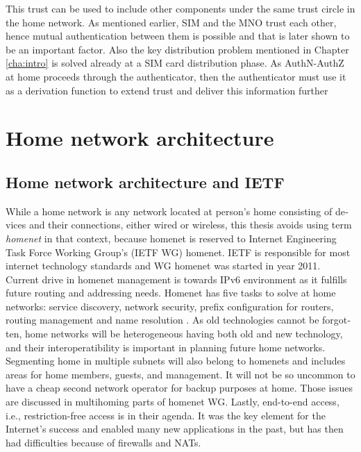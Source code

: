 \documentclass[12pt,a4paper,english]{tutthesis}
\begin{document}
\begin{otherlanguage}{english}
This trust can be used to include other components under the
same trust circle in the home network. As mentioned earlier,  SIM
and the MNO trust each other, hence mutual authentication between them is
possible and that is later shown to be an important factor.  Also the
key distribution problem mentioned in Chapter \ref{cha:intro} is solved
already at a SIM card distribution phase.  As AuthN-AuthZ at home
proceeds through the authenticator, then the authenticator must
use it as a derivation function
to extend trust 
 and
deliver this information further



\chapter{Home network architecture}
\label{sec-3}

\section{Home network architecture and IETF}
\label{sec-3-1}


While a home network is any network located at person's home consisting
of devices and their connections, either wired or wireless,
this thesis avoids using term \emph{homenet} in that context,
because  homenet  is  reserved to 
Internet Engineering Task Force Working Group's (IETF
WG) homenet. IETF is responsible for  most internet technology standards and 
WG homenet was started in year 2011.
Current drive in homenet management is towards IPv6 environment
 as it fulfills future routing and addressing needs. 
Homenet has five tasks to solve at home networks: service discovery, network security, 
prefix configuration for routers, routing management and name
resolution \cite{homenet-charter}.
As old technologies cannot be forgotten, home networks will be heterogeneous having both
old and new technology, and their interoperatibility is important in
planning future home networks. 
Segmenting home in multiple subnets will also belong
to homenets and includes areas for home members, guests,
and management. It will not be so uncommon to have a cheap second
network operator for backup purposes at home. Those issues are
discussed in multihoming parts of homenet WG.
Lastly, end-to-end access, i.e., restriction-free access is in their agenda. 
It was the key element for the Internet's success and enabled many new
applications in the past, but has then had difficulties because of
firewalls and NATs. 




\end{otherlanguage}
\end{document}

